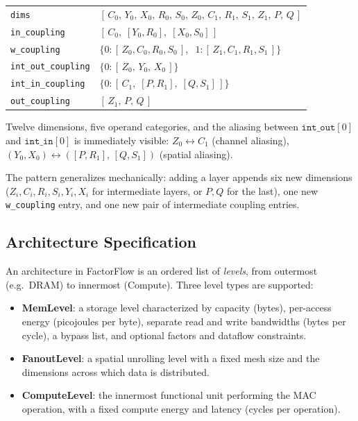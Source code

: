 \begin{center}
\small
\begin{tabular}{@{}l@{\;:\;\;}l@{}}
  \texttt{dims}
    & $[\,C_0,\, Y_0,\, X_0,\, R_0,\, S_0,\, Z_0,\,
       C_1,\, R_1,\, S_1,\, Z_1,\, P,\, Q\,]$ \\[3pt]
  \texttt{in\_coupling}
    & $[\,C_0,\; [Y_0, R_0],\; [X_0, S_0]\,]$ \\
  \texttt{w\_coupling}
    & $\{0\!: [\,Z_0, C_0, R_0, S_0\,],
       \;\; 1\!: [\,Z_1, C_1, R_1, S_1\,]\}$ \\
  \texttt{int\_out\_coupling}
    & $\{0\!: [\,Z_0,\, Y_0,\, X_0\,]\}$ \\
  \texttt{int\_in\_coupling}
    & $\{0\!: [\,C_1,\; [P, R_1],\; [Q, S_1]\,]\}$ \\
  \texttt{out\_coupling}
    & $[\,Z_1,\, P,\, Q\,]$ \\
\end{tabular}
\end{center}

\noindent
Twelve dimensions, five operand categories, and the aliasing between
$\texttt{int\_out}[0]$ and $\texttt{int\_in}[0]$ is immediately
visible: $Z_0 \leftrightarrow C_1$ (channel aliasing),
$(Y_0, X_0) \leftrightarrow ([P, R_1],\, [Q, S_1])$ (spatial aliasing).

The pattern generalizes mechanically: adding a layer appends six new
dimensions ($Z_i, C_i, R_i, S_i, Y_i, X_i$ for intermediate layers,
or $P, Q$ for the last), one new \texttt{w\_coupling} entry, and one
new pair of intermediate coupling entries.


\subsection{Architecture Specification}
\label{sec:ps-arch-spec}

An architecture in FactorFlow is an ordered list of \emph{levels},
from outermost (e.g.\ DRAM) to innermost (Compute).
Three level types are supported:
\begin{itemize}
  \item \textbf{MemLevel}: a storage level characterized by capacity
        (bytes), per-access energy (picojoules per byte), separate read
        and write bandwidths (bytes per cycle), a bypass list, and
        optional factors and dataflow constraints.
  \item \textbf{FanoutLevel}: a spatial unrolling level with a fixed
        mesh size and the dimensions across which data is distributed.
  \item \textbf{ComputeLevel}: the innermost functional unit
        performing the MAC operation, with a fixed compute energy and
        latency (cycles per operation).
\end{itemize}


